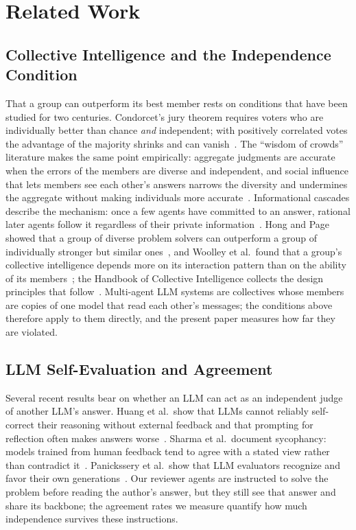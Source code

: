 \section{Related Work}
\label{sec:related}

\subsection{Collective Intelligence and the Independence Condition}
That a group can outperform its best member rests on conditions that have been studied for two centuries.
Condorcet's jury theorem requires voters who are individually better than chance \emph{and} independent; with positively correlated votes the advantage of the majority shrinks and can vanish~\cite{ladha1992condorcet}.
The ``wisdom of crowds'' literature makes the same point empirically: aggregate judgments are accurate when the errors of the members are diverse and independent, and social influence that lets members see each other's answers narrows the diversity and undermines the aggregate without making individuals more accurate~\cite{surowiecki2004wisdom,lorenz2011social}.
Informational cascades describe the mechanism: once a few agents have committed to an answer, rational later agents follow it regardless of their private information~\cite{bikhchandani1992cascades}.
Hong and Page showed that a group of diverse problem solvers can outperform a group of individually stronger but similar ones~\cite{hong2004groups}, and Woolley et al.\ found that a group's collective intelligence depends more on its interaction pattern than on the ability of its members~\cite{woolley2010evidence}; the Handbook of Collective Intelligence collects the design principles that follow~\cite{malone2015handbook}.
Multi-agent LLM systems are collectives whose members are copies of one model that read each other's messages; the conditions above therefore apply to them directly, and the present paper measures how far they are violated.

\subsection{LLM Self-Evaluation and Agreement}
Several recent results bear on whether an LLM can act as an independent judge of another LLM's answer.
Huang et al.\ show that LLMs cannot reliably self-correct their reasoning without external feedback and that prompting for reflection often makes answers worse~\cite{huang2024cannot}.
Sharma et al.\ document sycophancy: models trained from human feedback tend to agree with a stated view rather than contradict it~\cite{sharma2024sycophancy}.
Panickssery et al.\ show that LLM evaluators recognize and favor their own generations~\cite{panickssery2024llm}.
Our reviewer agents are instructed to solve the problem before reading the author's answer, but they still see that answer and share its backbone; the agreement rates we measure quantify how much independence survives these instructions.

